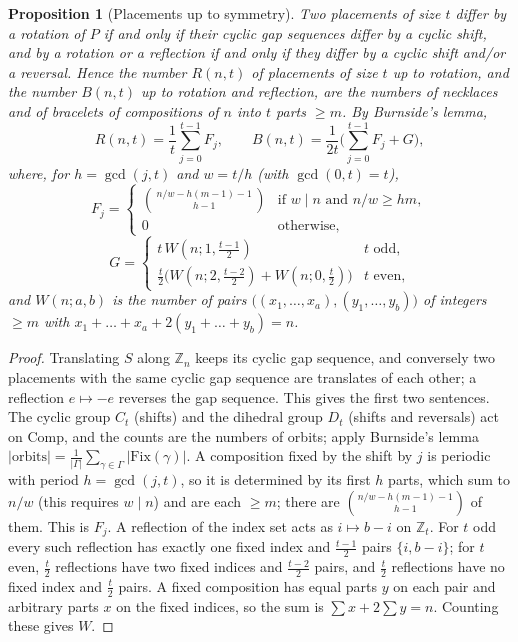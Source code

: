 \documentclass[11pt,a4paper]{article}
\newtheorem{proposition}[theorem]{Proposition}
\theoremstyle{definition}
\theoremstyle{remark}
\newcommand{\Z}{\mathbb{Z}}
\begin{document}
\begin{proposition}[Placements up to symmetry]\label{prop:burnside}
Two placements of size $t$ differ by a rotation of $P$ if and only if their cyclic gap sequences differ by a cyclic shift, and by a rotation or a reflection if and only if they differ by a cyclic shift and/or a reversal.
Hence the number $R(n,t)$ of placements of size $t$ up to rotation, and the number $B(n,t)$ up to rotation and reflection, are the numbers of necklaces and of bracelets of compositions of $n$ into $t$ parts $\ge m$. By Burnside's lemma,
\[
R(n,t)=\frac1t\sum_{j=0}^{t-1}F_j,\qquad
B(n,t)=\frac1{2t}\Big(\sum_{j=0}^{t-1}F_j+G\Big),
\]
where, for $h=\gcd(j,t)$ and $w=t/h$ (with $\gcd(0,t)=t$),
\[
F_j=\begin{cases}\binom{\,n/w-h(m-1)-1\,}{h-1}&\text{if }w\mid n\text{ and }n/w\ge hm,\\[2pt]0&\text{otherwise,}\end{cases}
\]
\[
G=\begin{cases}t\,W(n;1,\tfrac{t-1}2)&t\text{ odd},\\[2pt]\tfrac t2\big(W(n;2,\tfrac{t-2}2)+W(n;0,\tfrac t2)\big)&t\text{ even,}\end{cases}
\]
and $W(n;a,b)$ is the number of pairs $\big((x_1,\dots,x_a),(y_1,\dots,y_b)\big)$ of integers $\ge m$ with $x_1+\dots+x_a+2(y_1+\dots+y_b)=n$.
\end{proposition}
\begin{proof}
Translating $S$ along $\Z_n$ keeps its cyclic gap sequence, and conversely two placements with the same cyclic gap sequence are translates of each other; a reflection $e\mapsto-e$ reverses the gap sequence. This gives the first two sentences.
The cyclic group $C_t$ (shifts) and the dihedral group $D_t$ (shifts and reversals) act on $\mathrm{Comp}$, and the counts are the numbers of orbits; apply Burnside's lemma $|\text{orbits}|=\frac1{|\Gamma|}\sum_{\gamma\in\Gamma}|\mathrm{Fix}(\gamma)|$.
A composition fixed by the shift by $j$ is periodic with period $h=\gcd(j,t)$, so it is determined by its first $h$ parts, which sum to $n/w$ (this requires $w\mid n$) and are each $\ge m$; there are $\binom{n/w-h(m-1)-1}{h-1}$ of them. This is $F_j$.
A reflection of the index set acts as $i\mapsto b-i$ on $\mathbb Z_t$. For $t$ odd every such reflection has exactly one fixed index and $\frac{t-1}2$ pairs $\{i,b-i\}$; for $t$ even, $\frac t2$ reflections have two fixed indices and $\frac{t-2}2$ pairs, and $\frac t2$ reflections have no fixed index and $\frac t2$ pairs.
A fixed composition has equal parts $y$ on each pair and arbitrary parts $x$ on the fixed indices, so the sum is $\sum x+2\sum y=n$. Counting these gives $W$.
\end{proof}
\end{document}
